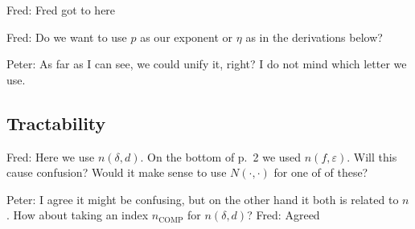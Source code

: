 \documentclass[USenglish]{article}
\theoremstyle{dgthm}
\theoremstyle{dgthm}
\theoremstyle{dgthm}
\theoremstyle{dgthm}
\theoremstyle{dgdef}
\theoremstyle{definition}
\newcommand{\FredNote}[1]{{\color{blue}Fred: #1}}
\newcommand{\PeterNote}[1]{{\color{orange}Peter: #1}}
\begin{document}
\FredNote{Fred got to here}

\FredNote{Do we want to use $p$ as our exponent or $\eta$ as in the derivations below?}

\PeterNote{As far as I can see, we could unify it, right? I do not mind which letter we use.}

\subsection{Tractability}\label{DHKM:SecPilotTract}

\FredNote{Here we use $n(\delta,d)$.  On the bottom of p.\ 2 we used $n(f,\varepsilon)$.  Will this cause confusion?  Would it make sense to use $N(\cdot,\cdot)$ for one of of these?}

\PeterNote{I agree it might be confusing, but on the other hand it both is related 
to $n$. How about taking an index $n_{\mathrm{COMP}}$ for $n(\delta,d)$?} \FredNote{Agreed}
\end{document}
